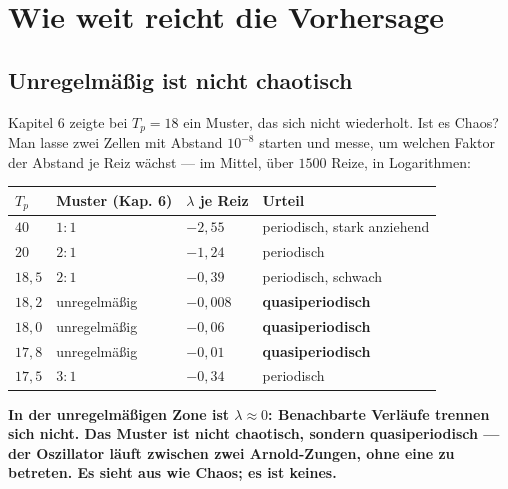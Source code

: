 \chapter{Wie weit reicht die Vorhersage}

\section{Unregelmäßig ist nicht chaotisch}

\begin{merksatz}
Kapitel 6 zeigte bei $T_p = 18$ ein Muster, das sich nicht wiederholt. Ist es Chaos? Man lasse zwei Zellen mit Abstand $10^{-8}$ starten und messe, um welchen Faktor der Abstand je Reiz wächst --- im Mittel, über $1500$ Reize, in Logarithmen:

\begin{center}
{\small
\renewcommand{\arraystretch}{1.46}
\begin{tabular}{@{}P{1.2cm}P{2.4cm}P{1.8cm}P{3.4cm}@{}}
\toprule
$T_p$ & \textbf{Muster (Kap. 6)} & $\lambda$ \textbf{je Reiz} & \textbf{Urteil}\\
\midrule
$40$ & $1\!:\!1$ & $-2{,}55$ & periodisch, stark anziehend\\
$20$ & $2\!:\!1$ & $-1{,}24$ & periodisch\\
$18{,}5$ & $2\!:\!1$ & $-0{,}39$ & periodisch, schwach\\
$18{,}2$ & unregelmäßig & $-0{,}008$ & \textbf{quasiperiodisch}\\
$18{,}0$ & unregelmäßig & $-0{,}06$ & \textbf{quasiperiodisch}\\
$17{,}8$ & unregelmäßig & $-0{,}01$ & \textbf{quasiperiodisch}\\
$17{,}5$ & $3\!:\!1$ & $-0{,}34$ & periodisch\\
\bottomrule
\end{tabular}}
\end{center}

\begin{center}
\begin{minipage}{0.9\textwidth}
\textbf{In der unregelmäßigen Zone ist $\lambda \approx 0$: Benachbarte Verläufe trennen sich nicht. Das Muster ist nicht chaotisch, sondern quasiperiodisch --- der Oszillator läuft zwischen zwei Arnold-Zungen, ohne eine zu betreten. Es sieht aus wie Chaos; es ist keines.}
\end{minipage}
\end{center}


\end{merksatz}
